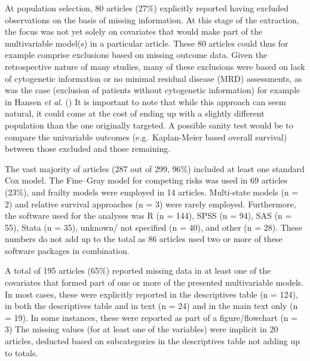 \documentclass[
  letterpaper,
  paper=240mm:170mm,
  twoside=true,
  open=right,
  fontsize=10pt,
  pagesize=false,
  BCOR=15mm,
  DIV=14,
  headinclude=true,
  footinclude=false,
  headsepline=on]{scrbook}
\begin{document}
At population selection, 80 articles (27\%) explicitly reported having
excluded observations on the basis of missing information. At this stage
of the extraction, the focus was not yet solely on covariates that would
make part of the multivariable model(s) in a particular article. These
80 articles could thus for example comprise exclusions based on missing
outcome data. Given the retrospective nature of many studies, many of
these exclusions were based on lack of cytogenetic information or no
minimal residual disease (MRD) assessments, as was the case (exclusion
of patients without cytogenetic information) for example in Hansen
\emph{et al.} () It is
important to note that while this approach can seem natural, it could
come at the cost of ending up with a slightly different population than
the one originally targeted. A possible sanity test would be to compare
the univariable outcomes (e.g.~Kaplan-Meier based overall survival)
between those excluded and those remaining.

The vast majority of articles (287 out of 299, 96\%) included at least
one standard Cox model. The Fine--Gray model for competing risks was
used in 69 articles (23\%), and frailty models were employed in 14
articles. Multi-state models (n = 2) and relative survival approaches (n
= 3) were rarely employed. Furthermore, the software used for the
analyses was R (n = 144), SPSS (n = 94), SAS (n = 55), Stata (n = 35),
unknown/ not specified (n = 40), and other (n = 28). These numbers do
not add up to the total as 86 articles used two or more of these
software packages in combination.

A total of 195 articles (65\%) reported missing data in at least one of
the covariates that formed part of one or more of the presented
multivariable models. In most cases, these were explicitly reported in
the descriptives table (n = 124), in both the descriptives table and in
text (n = 24) and in the main text only (n = 19). In some instances,
these were reported as part of a figure/flowchart (n = 3) The missing
values (for at least one of the variables) were implicit in 20 articles,
deducted based on subcategories in the descriptives table not adding up
to totals.
\end{document}
